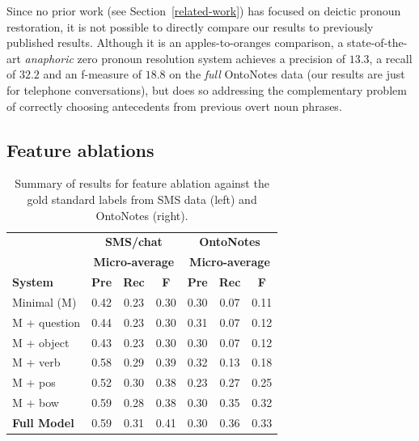 \documentclass[11pt]{report}
\renewcommand\cite{\citep}	%
\begin{document}
Since no prior work (see Section~\ref{related-work}) has focused on deictic pronoun restoration, it is not possible to directly compare our results to previously published results. Although it is an apples-to-oranges comparison, a state-of-the-art \emph{anaphoric} zero pronoun resolution system \cite{chenchinese} achieves a precision of $13.3$, a recall of $32.2$ and an f-measure of $18.8$ on the \emph{full} OntoNotes data (our results are just for telephone conversations), but does so addressing the complementary problem of correctly choosing antecedents from previous overt noun phrases.

\subsection{Feature ablations} \label{ablation}

\begin{table}[t]
\begin{footnotesize}
\begin{center}
\begin{tabular}{|l|c|c|c|c|c|c|}
\hline
                         & \multicolumn{3}{c|}{\bf SMS/chat}                          & \multicolumn{3}{c|}{\bf OntoNotes} \\
                         & \multicolumn{3}{c|}{\bf Micro-average}                          & \multicolumn{3}{c|}{\bf Micro-average} \\
\bf System               & \bf Pre & \bf Rec & \bf F &\bf Pre & \bf Rec & \bf F \\
\hline
    Minimal (M)       & 0.42 	& 0.23 	& 0.30    & 0.30 	& 0.07 	& 0.11    \\
    M +  question 	& 0.44 & 0.23 & 0.30     & 0.31 & 0.07 & 0.12   \\
    M + object		& 0.43 & 0.23 & 0.30   & 0.30 & 0.07 & 0.12  \\
    M +  verb	           & 0.58 & 0.29 & 0.39    & 0.32 & 0.13 & 0.18    \\
    M + pos 		  & 0.52 & 0.30 & 0.38   & 0.23 & 0.27 & 0.25  \\
    M + bow		& 0.59 & 0.28 & 0.38 & 0.30 & 0.35 & 0.32  \\
    \bf Full Model           & 0.59    & 0.31    & 0.41    & 0.30    & 0.36    & 0.33    \\
\hline
\end{tabular}
\end{center}
\end{footnotesize}
\caption{\label{feature-ablation} Summary of results for feature ablation against the gold standard labels from SMS data (left) and OntoNotes (right).}
\end{table}
\end{document}
